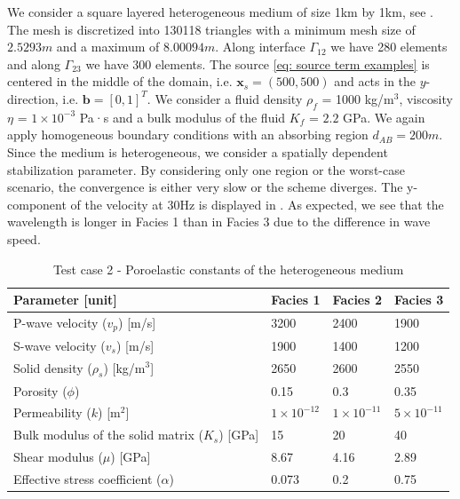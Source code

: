 \documentclass[pdflatex,sn-mathphys-num]{sn-jnl}
\theoremstyle{thmstyleone}%
\theoremstyle{thmstyletwo}%
\theoremstyle{thmstylethree}%
\theoremstyle{definition}
\begin{document}
	
	
	We consider a square layered heterogeneous medium of size 1km by 1km, see . The mesh is discretized into 130118 triangles with a minimum mesh size of $2.5293 m$ and a maximum of $8.00094 m$. Along interface $\Gamma_{12}$ we have 280 elements and along $\Gamma_{23}$ we have 300 elements. The source \eqref{eq: source term examples} is centered in the middle of the domain, i.e. $\textbf{x}_s=(500,500)$ and acts in the $y$-direction, i.e. $\textbf{b}=[0,1]^{T}$. We consider a fluid density \(\rho_f\) = 1000 kg/m\(^3\), viscosity \(\eta\) = \(1 \times 10^{-3}\) Pa·s and a bulk modulus of the fluid \(K_f\) = $2.2$ GPa. We again apply homogeneous boundary conditions with an absorbing region $d_{AB}=200m$. Since the medium is heterogeneous, we consider a spatially dependent stabilization parameter. By considering only one region or the worst-case scenario, the convergence is either very slow or the scheme diverges. The y-component of the velocity at 30Hz is displayed in . As expected, we see that the wavelength is longer in Facies 1 than in Facies 3 due to the difference in wave speed.
	
	
	
	
	\begin{table}[ht]
		\renewcommand{\arraystretch}{1.1} 
		\caption{Test case 2 - Poroelastic constants of the heterogeneous medium}
		\begin{tabular}{llll}
			\hline
			\textbf{Parameter} [unit]& \textbf{Facies 1} & \textbf{Facies 2}  & \textbf{Facies 3}\\ \hline
			P-wave velocity (\(v_p\)) [m/s] & 3200  & 2400 & 1900\\ 
			S-wave velocity (\(v_s\)) [m/s]& 1900 & 1400 & 1200\\ 
			Solid density (\(\rho_s\)) [kg/m\(^3\)]& 2650 & 2600 & 2550  \\ 
			Porosity (\(\phi\)) & 0.15 & 0.3 & 0.35\\ 
			Permeability (\(k\)) [m\(^2\)] & \(1 \times 10^{-12}\) &\(1 \times 10^{-11}\) &\(5 \times 10^{-11}\)  \\ 
			Bulk modulus of the solid matrix (\(K_s\)) [GPa]& 15  & 20 & 40\\
			Shear modulus (\(\mu\)) [GPa] & 8.67 & 4.16 & 2.89\\ 
			Effective stress coefficient (\(\alpha\)) & 0.073 &0.2&0.75\\ \hline
		\end{tabular}
		\label{tab:poroelastic_constants2}
	\end{table}
	
\end{document}

